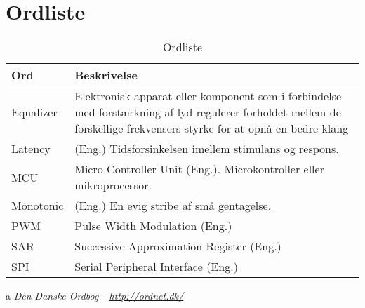\chapter{Ordliste} \label{bilag:ordliste}

\begin{table}[h!]
	\caption{Ordliste}
	\label{tab:ordliste}
	\begin{threeparttable}
		\begin{tabular}{l p{}}
			\toprule
			\textbf{Ord}      & \textbf{Beskrivelse}   \\ 
			\midrule
			Equalizer 	& Elektronisk apparat eller komponent som i forbindelse med forstærkning af lyd regulerer forholdet mellem de forskellige frekvensers styrke for at opnå en bedre klang \tnote{a} \\
			Latency		& (Eng.) Tidsforsinkelsen imellem stimulans og respons.\\ 
			MCU       	& Micro Controller Unit (Eng.). Microkontroller eller mikroprocessor. \\
			Monotonic 	& (Eng.) En evig stribe af små gentagelse.  \tnote{a}\\
			PWM			& Pulse Width Modulation (Eng.) \\
			SAR			& Successive Approximation Register (Eng.)\\
			SPI			& Serial Peripheral Interface (Eng.)  \\
			\bottomrule
		\end{tabular}
	
		\begin{tablenotes}
			\item[a] \textit{Den Danske Ordbog - \url{http://ordnet.dk/}}
		\end{tablenotes}
	\end{threeparttable}
\end{table}
